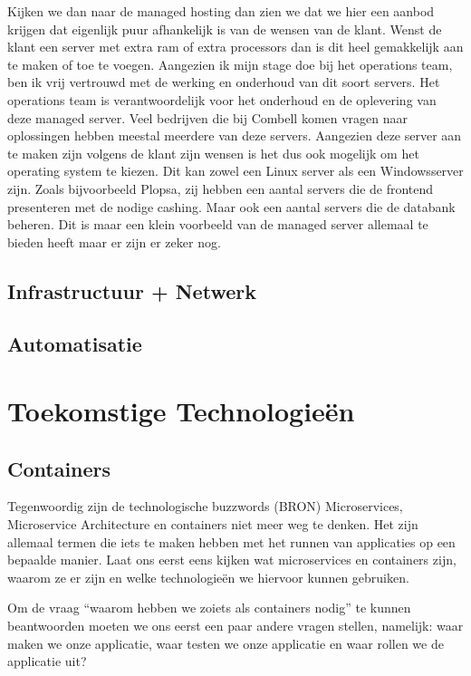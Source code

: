 Kijken we dan naar de managed hosting dan zien we dat we hier een aanbod krijgen dat eigenlijk puur afhankelijk is van de wensen van de klant. Wenst de klant een server met extra ram of extra processors dan is dit heel gemakkelijk aan te maken of toe te voegen. Aangezien ik mijn stage doe bij het operations team, ben ik vrij vertrouwd met de werking en onderhoud van dit soort servers. Het operations team is verantwoordelijk voor het onderhoud en de oplevering van deze managed server. Veel bedrijven die bij Combell komen vragen naar oplossingen hebben meestal meerdere van deze servers. Aangezien deze server aan te maken zijn volgens de klant zijn wensen is het dus ook mogelijk om het operating system te kiezen. Dit kan zowel een Linux server als een Windowsserver zijn. Zoals bijvoorbeeld Plopsa, zij hebben een aantal servers die de frontend presenteren met de nodige cashing. Maar ook een aantal servers die de databank beheren. Dit is maar een klein voorbeeld van de managed server allemaal te bieden heeft maar er zijn er zeker nog.

\subsection{Infrastructuur + Netwerk}

\subsection{Automatisatie}

\section{Toekomstige Technologieën}

\subsection{Containers}

Tegenwoordig zijn de technologische buzzwords (BRON) Microservices, Microservice Architecture en containers niet meer weg te denken. Het zijn allemaal termen die iets te maken hebben met het runnen van applicaties op een bepaalde manier. Laat ons eerst eens kijken wat microservices en containers zijn, waarom ze er zijn en welke technologieën we hiervoor kunnen gebruiken. 

Om de vraag “waarom hebben we zoiets als containers nodig” te kunnen beantwoorden  moeten we ons eerst een paar andere vragen stellen, namelijk: waar maken we onze applicatie, waar testen we onze applicatie en waar rollen we de applicatie uit?

